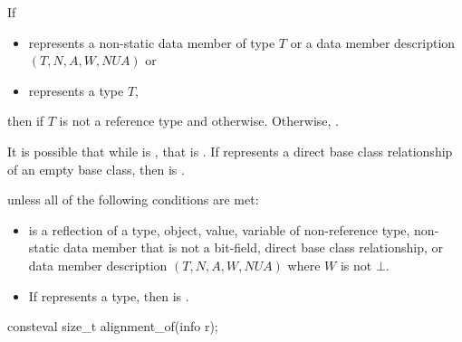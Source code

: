 \begin{itemdescr}
\pnum
\returns
If
\begin{itemize}
\item {} represents a non-static data member of type $T$ or
a data member description $(T, N, A, W, \mathit{NUA})$ or
\item {} represents a type $T$,
\end{itemize}
then  if $T$ is not a reference type
and  otherwise.
Otherwise, .
\begin{note}
It is possible that while 
is ,
that 
is .
If  represents a direct base class relationship of an empty base class,
then  is .
\end{note}

\pnum
\throws
{} unless
all of the following conditions are met:
\begin{itemize}
\item
{} is a reflection of a
type,
object,
value,
variable of non-reference type,
non-static data member that is not a bit-field,
direct base class relationship, or
data member description $(T, N, A, W, \mathit{NUA})$
where $W$ is not $\bot$.
\item
If  represents a type,
then  is .
\end{itemize}
\end{itemdescr}

%
\begin{itemdecl}
consteval size_t alignment_of(info r);
\end{itemdecl}

